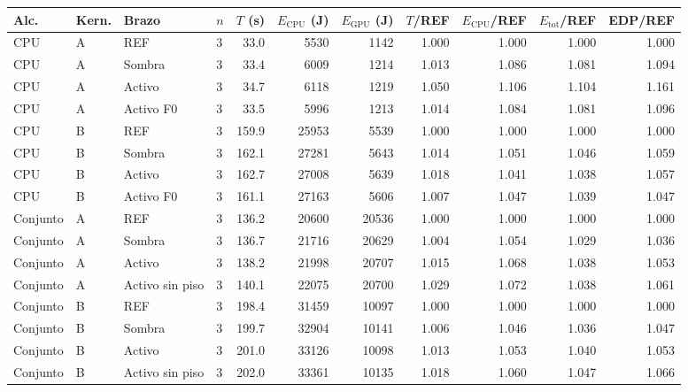 \begin{tabular}{@{}llllrrrrrrr@{}}
\toprule
\textbf{Alc.} & \textbf{Kern.} & \textbf{Brazo} & \textbf{$n$} & \textbf{$T$ (s)} & \textbf{$E_{\mathrm{CPU}}$ (J)} & \textbf{$E_{\mathrm{GPU}}$ (J)} & \textbf{$T$/REF} & \textbf{$E_{\mathrm{CPU}}$/REF} & \textbf{$E_{\mathrm{tot}}$/REF} & \textbf{EDP/REF} \\
\midrule
CPU & A & REF & 3 & 33.0 & 5530 & 1142 & 1.000 & 1.000 & 1.000 & 1.000 \\
CPU & A & Sombra & 3 & 33.4 & 6009 & 1214 & 1.013 & 1.086 & 1.081 & 1.094 \\
CPU & A & Activo & 3 & 34.7 & 6118 & 1219 & 1.050 & 1.106 & 1.104 & 1.161 \\
CPU & A & Activo F0 & 3 & 33.5 & 5996 & 1213 & 1.014 & 1.084 & 1.081 & 1.096 \\
\midrule
CPU & B & REF & 3 & 159.9 & 25953 & 5539 & 1.000 & 1.000 & 1.000 & 1.000 \\
CPU & B & Sombra & 3 & 162.1 & 27281 & 5643 & 1.014 & 1.051 & 1.046 & 1.059 \\
CPU & B & Activo & 3 & 162.7 & 27008 & 5639 & 1.018 & 1.041 & 1.038 & 1.057 \\
CPU & B & Activo F0 & 3 & 161.1 & 27163 & 5606 & 1.007 & 1.047 & 1.039 & 1.047 \\
\midrule
Conjunto & A & REF & 3 & 136.2 & 20600 & 20536 & 1.000 & 1.000 & 1.000 & 1.000 \\
Conjunto & A & Sombra & 3 & 136.7 & 21716 & 20629 & 1.004 & 1.054 & 1.029 & 1.036 \\
Conjunto & A & Activo & 3 & 138.2 & 21998 & 20707 & 1.015 & 1.068 & 1.038 & 1.053 \\
Conjunto & A & Activo sin piso & 3 & 140.1 & 22075 & 20700 & 1.029 & 1.072 & 1.038 & 1.061 \\
\midrule
Conjunto & B & REF & 3 & 198.4 & 31459 & 10097 & 1.000 & 1.000 & 1.000 & 1.000 \\
Conjunto & B & Sombra & 3 & 199.7 & 32904 & 10141 & 1.006 & 1.046 & 1.036 & 1.047 \\
Conjunto & B & Activo & 3 & 201.0 & 33126 & 10098 & 1.013 & 1.053 & 1.040 & 1.053 \\
Conjunto & B & Activo sin piso & 3 & 202.0 & 33361 & 10135 & 1.018 & 1.060 & 1.047 & 1.066 \\
\bottomrule
\end{tabular}

